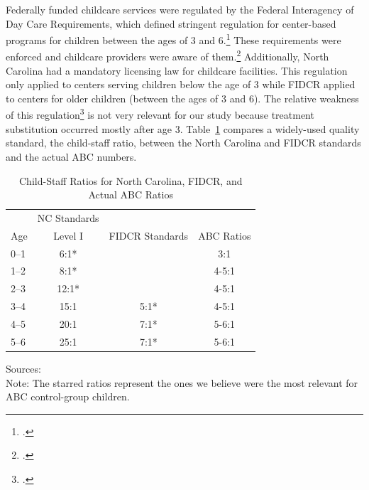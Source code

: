 \begin{appendices}
\noindent Federally funded childcare services were regulated by the Federal Interagency of Day Care Requirements, which defined stringent regulation for center-based programs for children between the ages of 3 and 6.\footnote{\citet{Department-of-Health_1968_DayCareRequirements}.} These requirements were enforced and childcare providers were aware of them.\footnote{\citet{Kuperman_2015_Clifford-Russell-Interview}.} Additionally, North Carolina had a mandatory licensing law for childcare facilities. This regulation only applied to centers serving children below the age of 3 while FIDCR applied to centers for older children (between the ages of 3 and 6). The relative weakness of this regulation\footnote{\citet{NCGA_1971_House-Bill-100}.} is not very relevant for our study because treatment substitution occurred mostly after age 3. Table~\ref{table:staff} compares a widely-used quality standard, the child-staff ratio, between the North Carolina and FIDCR standards and the actual ABC numbers.

\begin{table}[H]
\caption{Child-Staff Ratios for North Carolina, FIDCR, and Actual ABC Ratios}
\label{table:staff}
\begin{threeparttable}
\begin{tabular}{lccc}
\hline \hline
 &NC Standards &	&  \\
Age	& Level I & FIDCR Standards  & ABC Ratios\\ \hline
0--1	& 6:1*	&  				& 	3:1					\\
1--2	& 8:1* 	& 				&   4-5:1				\\
2--3	& 12:1* & 				& 	4-5:1				\\
3--4	& 15:1 	& 		5:1*	& 	4-5:1 				\\
4--5	& 20:1 	& 		7:1*	& 	5-6:1 				\\
5--6 & 25:1  &		7:1*	&	5-6:1				\\
\hline \hline
\end{tabular}
\begin{tablenotes}
\footnotesize
Sources: \cite{Department-of-Health_1968_DayCareRequirements,NCGA_1971_House-Bill-100,Ramey-et-al_1977_Intro-to-ABC,Ramey_Campbell_1979_SR,Ramey_McGinness_etal_1982_Abecedarianapproach} \\
Note: The starred ratios represent the ones we believe were the most relevant for ABC control-group children.
\end{tablenotes}
\end{threeparttable}
\end{table}


\end{appendices}
